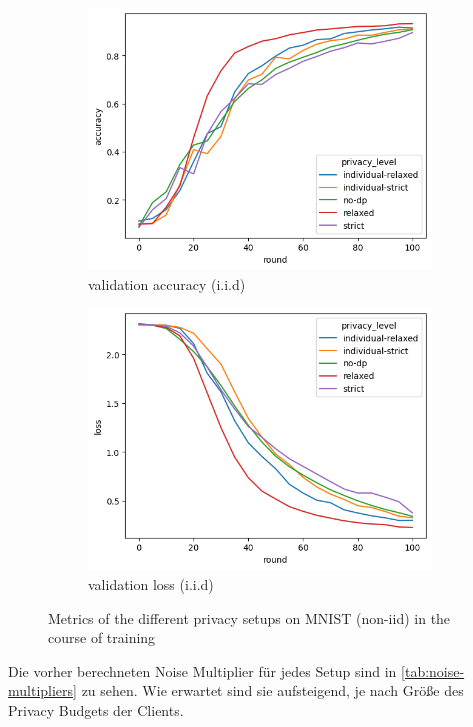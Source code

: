 \begin{figure}
\begin{subfigure}{0.4\textwidth}
		\includegraphics[width=\textwidth]{Bilder/emnist-accuracy-iid.png}
		\caption{validation accuracy (i.i.d)}
	\end{subfigure}
	\begin{subfigure}{0.4\textwidth}
		\centering
		\includegraphics[width=\textwidth]{Bilder/emnist-loss-iid.png}
		\caption{validation loss (i.i.d)}
	\end{subfigure}
	\label{fig:fed-emnist-results}
	\caption{Metrics of the different privacy setups on MNIST (non-iid) in the course of training}
\end{figure}

Die vorher berechneten Noise Multiplier für jedes Setup sind in \autoref{tab:noise-multipliers} zu sehen. Wie erwartet sind sie aufsteigend, je nach Größe des Privacy Budgets der Clients.


